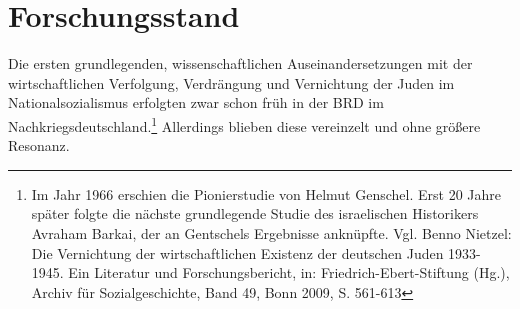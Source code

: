 \section{Forschungsstand}

Die ersten grundlegenden, wissenschaftlichen Auseinandersetzungen mit der wirtschaftlichen Verfolgung, Verdrängung und Vernichtung der Juden im Nationalsozialismus erfolgten zwar schon früh in der BRD im Nachkriegsdeutschland.\footnote{Im Jahr 1966 erschien die Pionierstudie von Helmut Genschel. Erst 20 Jahre später folgte die nächste grundlegende Studie des israelischen Historikers Avraham Barkai, der an Gentschels Ergebnisse anknüpfte. Vgl. Benno Nietzel: Die Vernichtung der wirtschaftlichen Existenz der deutschen Juden 1933-1945. Ein Literatur und Forschungsbericht, in: Friedrich-Ebert-Stiftung (Hg.), Archiv für Sozialgeschichte, Band 49, Bonn 2009, S. 561-613} Allerdings blieben diese vereinzelt und ohne größere Resonanz. 

